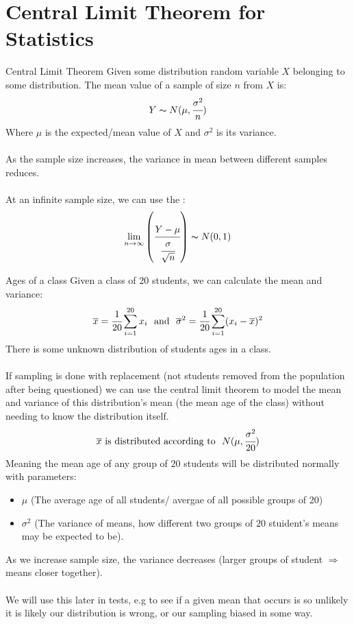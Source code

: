 \section{Central Limit Theorem for Statistics}
\begin{definitionbox}{Central Limit Theorem}
	Given some distribution random variable $X$ belonging to some distribution. The mean value of a sample of size $n$ from $X$ is:
	\[Y \thicksim N(\mu, \cfrac{\sigma^2}{n})\]
	Where $\mu$ is the expected/mean value of $X$ and $\sigma^2$ is its variance.
	\\
	\\ As the sample size increases, the variance in mean between different samples reduces.
	\\
	\\ At an infinite sample size, we can use the :
	\[\lim_{n \to \infty} \left( \cfrac{Y - \mu}{\cfrac{\sigma}{\sqrt{n}}} \right) \thicksim N(0,1)\]
\end{definitionbox}
\begin{examplebox}{Ages of a class}
	Given a class of $20$ students, we can calculate the mean and variance:
	\[\overline{x} = \cfrac{1}{20} \sum_{i = 1}^{20}x_i \ \text{ and } \ \overline{\sigma}^2 = \cfrac{1}{20} \sum_{i = 1}^{20} (x_i - \overline{x})^2\]
	There is some unknown distribution of students ages in a class.
	\\
	\\ If sampling is done with replacement (not students removed from the population after being questioned) we can use the central limit theorem to model the mean and variance of this distribution's mean (the mean age of the class) without needing to know the distribution itself.
	\[\overline{x} \ \text{is distributed according to } \ N(\mu, \cfrac{\sigma^2}{20})\]
	Meaning  the mean age of any group of $20$ students will be distributed normally with parameters:
	\begin{itemize}
		\item $\mu$ (The average age of all students/ avergae of all possible groups of 20)
		\item $\sigma^2$ (The variance of means, how different two groups of $20$ stuident's means may be expected to be).
    \end{itemize}
	As we increase sample size, the variance decreases (larger groups of student $\Rightarrow$ means closer together).
	\\
	\\ We will use this later in tests, e.g to see if a given mean that occurs is so unlikely it is likely our distribution is wrong, or our sampling biased in some way.
\end{examplebox}
